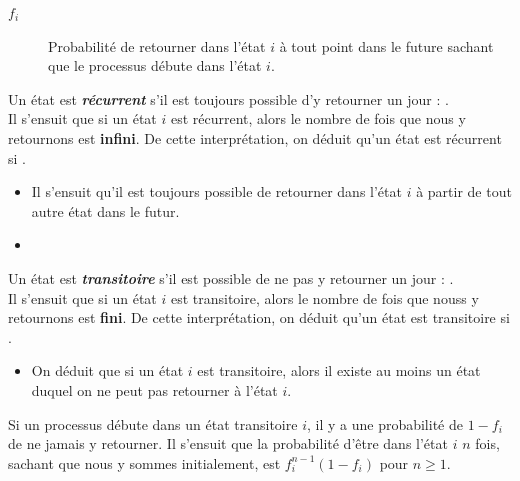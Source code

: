 \documentclass[10pt, french]{article}
\begin{document}
\begin{multicols*}{2}
\begin{distributions}[Notation]
\begin{description}
	\item[$f_{i}$]	Probabilité de retourner dans l'état $i$ à tout point dans le future sachant que le processus débute dans l'état $i$.
\end{description}
\end{distributions}

\begin{definitionNOHFILLprop}
Un état est \textbf{\textit{récurrent}} s'il est toujours possible d'y retourner un jour : . \\

Il s'ensuit que si un état $i$ est récurrent, alors le nombre de fois que nous y retournons est \textbf{infini}. De cette interprétation, on déduit qu'un état est récurrent si .

\begin{itemize}
	\item	Il s'ensuit qu'il est toujours possible de retourner dans l'état $i$ à partir de tout autre état dans le futur.
	\item	
\end{itemize}	
\end{definitionNOHFILLprop}

\begin{definitionNOHFILLprop}
Un état est \textit{\textbf{transitoire}} s'il est possible de ne pas y retourner un jour : .\\

Il s'ensuit que si un état $i$ est transitoire, alors le nombre de fois que nouss y retournons est \textbf{fini}. De cette interprétation, on déduit qu'un état est transitoire si .

\begin{itemize}
	\item	On déduit que si un état $i$ est transitoire, alors il existe au moins un état duquel on ne peut pas retourner à l'état $i$. 
\end{itemize}

\begin{definitionNOHFILLpropos}
Si un processus débute dans un état transitoire $i$, il y a une probabilité de $1 - f_{i}$ de ne jamais y retourner. Il s'ensuit que la probabilité d'être dans l'état $i$ $n$ fois, sachant que nous y sommes initialement, est $f_{i}^{n - 1}(1 - f_{i})$ pour $n \geq 1$.	\\


\end{definitionNOHFILLpropos}
\end{definitionNOHFILLprop}
\end{multicols*}
\end{document}
